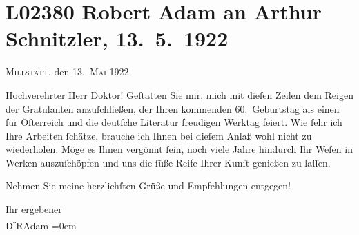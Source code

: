 

\section[Robert Adam an Arthur Schnitzler, 13. 5. 1922]{L02380 Robert Adam an Arthur Schnitzler, 13. 5. 1922}
\nopagebreak{}
\rehead{ }\normalsize\beginnumbering{}
\toendnotes[C]{\smallbreak\pagebreak[2]}
\toendnotes[C]{\smallbreak}
\pstart
           \raggedleft{}{\pb}\textsc{Millstatt}, den 13. \textsc{Mai} 1922\pend
           
\pstart\center{}Hochverehrter Herr Doktor!\pend\vspace{0.5em}
\pstart
           Geſtatten Sie mir, mich mit dieſen Zeilen dem Reigen der Gratulanten anzuſchließen,
               der Ihren kommenden 60. Geburtstag als einen für Öſterreich und die deutſche Literatur freudigen Werktag feiert. Wie{ }ſehr ich
               Ihre Arbeiten{ }ſchätze, brauche ich Ihnen bei dieſem Anlaß wohl nicht zu wiederholen.
               Möge es Ihnen vergönnt{ }ſein, {\pb}noch viele Jahre
               hindurch Ihr Weſen in Werken auszuſchöpfen und uns die{ }ſüße Reife Ihrer Kunſt
               genießen zu laſſen.\pend
           
\pstart
           Nehmen Sie meine herzlichſten Grüße und Empfehlungen entgegen!\pend
           
\pstart
           Ihr ergebener{\\[\baselineskip]}\spacefill\mbox{D\textsuperscript{r}RAdam}\pend
           \leftskip=0em{}\endnumbering{}  \newcommand{\dateiname}{L02380}\newcommand{\titel}{Robert Adam an Arthur Schnitzler, 13. 5. 1922}\newcommand{\editorInnen}{Martin Anton Müller und Gerd-Hermann Susen}
